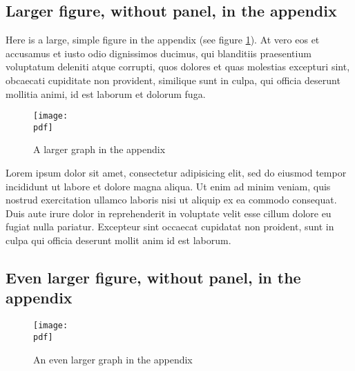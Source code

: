 \documentclass[letterpaper,11pt,leqno]{article}
\newcommand{\pdf}{figures.pdf}
\begin{document}
\subsection{Larger figure, without panel, in the appendix} 

Here is a large, simple figure in the appendix (see figure \ref{f:appendix1}). At vero eos et accusamus et iusto odio dignissimos ducimus, qui blanditiis praesentium voluptatum deleniti atque corrupti, quos dolores et quas molestias excepturi sint, obcaecati cupiditate non provident, similique sunt in culpa, qui officia deserunt mollitia animi, id est laborum et dolorum fuga.

\begin{figure}[t]
\texttt{[image: \\pdf]}
\caption{A larger graph in the appendix}
\label{f:appendix1}\end{figure}

Lorem ipsum dolor sit amet, consectetur adipisicing elit, sed do eiusmod
tempor incididunt ut labore et dolore magna aliqua. Ut enim ad minim veniam,
quis nostrud exercitation ullamco laboris nisi ut aliquip ex ea commodo
consequat. Duis aute irure dolor in reprehenderit in voluptate velit esse
cillum dolore eu fugiat nulla pariatur. Excepteur sint occaecat cupidatat non
proident, sunt in culpa qui officia deserunt mollit anim id est laborum.

\subsection{Even larger figure, without panel, in the appendix} 

\begin{figure}[p]
\texttt{[image: \\pdf]}
\caption{An even larger graph in the appendix}
\label{f:appendix2}\end{figure}
\end{document}
